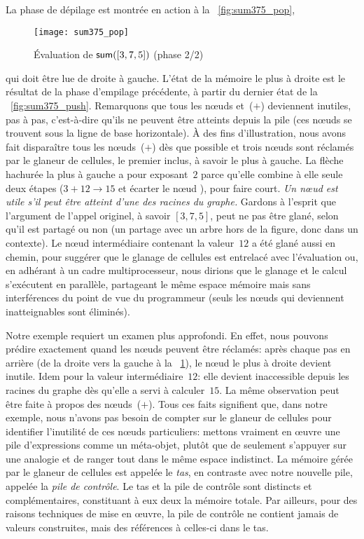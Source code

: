 La phase de dépilage est montrée en action à la \fig~\vref{fig:sum375_pop},
\begin{figure}[b]
\centering
\texttt{[image: sum375\_pop]}
\caption{Évaluation de \(\textsf{sum}([3,7,5])\) (phase 2/2)}
\label{fig:sum375_pop}
\end{figure}
qui doit être lue de droite à gauche. L'état de la mémoire le plus à
droite est le résultat de la phase d'empilage précédente, à partir du
dernier état de la \fig~\ref{fig:sum375_push}. Remarquons que tous les
n{\oe}uds  et~(\(+\)) deviennent inutiles, pas à pas,
c'est-à-dire qu'ils ne peuvent être atteints depuis la pile (ces
n{\oe}uds se trouvent sous la ligne de base horizontale). À des fins
d'illustration, nous avons fait disparaître tous les n{\oe}uds~(\(+\))
dès que possible et trois n{\oe}uds  sont réclamés par le
glaneur de cellules, le premier inclus, à savoir le plus à gauche. La
flèche hachurée la plus à gauche a pour exposant~\(2\) parce qu'elle
combine à elle seule deux étapes (\(3+12 \rightarrow 15\) et écarter
le n{\oe}ud ), pour faire court. \emph{Un n{\oe}ud est utile
  s'il peut être atteint d'une des racines du graphe.} Gardons à
l'esprit que l'argument de l'appel originel, à savoir \([3,7,5]\),
peut ne pas être glané, selon qu'il est partagé ou non (un partage
avec un arbre hors de la figure, donc dans un contexte). Le n{\oe}ud
intermédiaire contenant la valeur~\(12\) a été glané aussi en chemin,
pour suggérer que le glanage de cellules est entrelacé avec
l'évaluation ou, en adhérant à un cadre multiprocesseur, nous dirions
que le glanage et le calcul s'exécutent en parallèle, partageant le
même espace mémoire mais sans interférences du point de vue du
programmeur (seuls les n{\oe}uds qui deviennent inatteignables sont
éliminés).

Notre exemple requiert un examen plus approfondi. En effet, nous
pouvons prédire exactement quand les n{\oe}uds  peuvent être
réclamés: après chaque pas en arrière (de la droite vers la gauche à
la \fig~\ref{fig:sum375_pop}), le n{\oe}ud  le plus à droite
devient inutile. Idem pour la valeur intermédiaire~\(12\): elle
devient inaccessible depuis les racines du graphe dès qu'elle a servi
à calculer~\(15\). La même observation peut être faite à propos des
n{\oe}uds~(\(+\)). Tous ces faits signifient que, dans notre exemple,
nous n'avons pas besoin de compter sur le glaneur de cellules pour
identifier l'inutilité de ces n{\oe}uds particuliers: mettons vraiment
en {\oe}uvre une pile d'expressions comme un méta-objet, plutôt que de
seulement s'appuyer sur une analogie et de ranger tout dans le même
espace indistinct. La mémoire gérée par le glaneur de cellules est
appelée le \emph{tas}, en contraste avec notre nouvelle pile, appelée
la \emph{pile de contrôle}. Le tas et la pile de contrôle sont
distincts et complémentaires, constituant à eux deux la mémoire
totale. Par ailleurs, pour des raisons techniques de mise en
{\oe}uvre, la pile de contrôle ne contient jamais de valeurs
construites, mais des références à celles-ci dans le tas.

